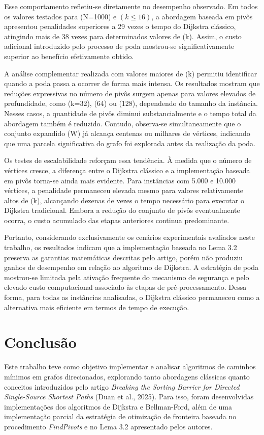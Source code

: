 \documentclass[10pt,a4paper]{article}
\begin{document}
Esse comportamento refletiu-se diretamente no desempenho observado. Em todos os valores testados para (N=1000) e $(k \le 16)$, a abordagem baseada em pivôs apresentou penalidades superiores a 29 vezes o tempo do Dijkstra clássico, atingindo mais de 38 vezes para determinados valores de (k). Assim, o custo adicional introduzido pelo processo de poda mostrou-se significativamente superior ao benefício efetivamente obtido.

A análise complementar realizada com valores maiores de (k) permitiu identificar quando a poda passa a ocorrer de forma mais intensa. Os resultados mostram que reduções expressivas no número de pivôs surgem apenas para valores elevados de profundidade, como (k=32), (64) ou (128), dependendo do tamanho da instância. Nesses casos, a quantidade de pivôs diminui substancialmente e o tempo total da abordagem também é reduzido. Contudo, observa-se simultaneamente que o conjunto expandido (W) já alcança centenas ou milhares de vértices, indicando que uma parcela significativa do grafo foi explorada antes da realização da poda.

Os testes de escalabilidade reforçam essa tendência. À medida que o número de vértices cresce, a diferença entre o Dijkstra clássico e a implementação baseada em pivôs torna-se ainda mais evidente. Para instâncias com 5.000 e 10.000 vértices, a penalidade permaneceu elevada mesmo para valores relativamente altos de (k), alcançando dezenas de vezes o tempo necessário para executar o Dijkstra tradicional. Embora a redução do conjunto de pivôs eventualmente ocorra, o custo acumulado das etapas anteriores continua predominante.

Portanto, considerando exclusivamente os cenários experimentais avaliados neste trabalho, os resultados indicam que a implementação baseada no Lema 3.2 preserva as garantias matemáticas descritas pelo artigo, porém não produziu ganhos de desempenho em relação ao algoritmo de Dijkstra. A estratégia de poda mostrou-se limitada pela ativação frequente do mecanismo de segurança e pelo elevado custo computacional associado às etapas de pré-processamento. Dessa forma, para todas as instâncias analisadas, o Dijkstra clássico permaneceu como a alternativa mais eficiente em termos de tempo de execução.


\section{Conclusão}

Este trabalho teve como objetivo implementar e analisar algoritmos de caminhos mínimos em grafos direcionados, explorando tanto abordagens clássicas quanto conceitos introduzidos pelo artigo \textit{Breaking the Sorting Barrier for Directed Single-Source Shortest Paths} (Duan et al., 2025). Para isso, foram desenvolvidas implementações dos algoritmos de Dijkstra e Bellman-Ford, além de uma implementação parcial da estratégia de otimização de fronteira baseada no procedimento \textit{FindPivots} e no Lema 3.2 apresentado pelos autores.
\end{document}
